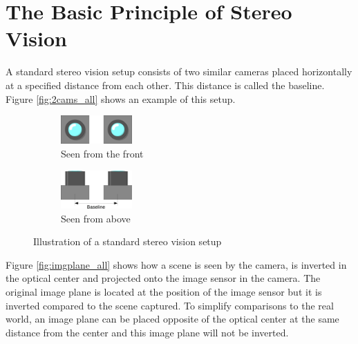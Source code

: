 \section{The Basic Principle of Stereo Vision}\label{sec:basicstereo}
A standard stereo vision setup consists of two similar cameras placed horizontally at a specified distance from each other. This distance is called the baseline. Figure \vref{fig:2cams_all} shows an example of this setup.\\
\begin{figure}[ht!]
  \centering
  \begin{subfigure}[t]{1\textwidth}
    \centering\includegraphics[width=0.3\textwidth]{figures/2cams_fro}
    \caption{Seen from the front\label{fig:2cams_fro}}
  \end{subfigure}\vspace{0.4cm}
  \begin{subfigure}[t]{1\textwidth}
    \centering\includegraphics[width=0.3\textwidth]{figures/2cams_top}
    \caption{Seen from above\label{fig:2cams_top}}
  \end{subfigure}
  \caption{Illustration of a standard stereo vision setup\label{fig:2cams_all}}
\end{figure}

Figure \vref{fig:imgplane_all} shows how a scene is seen by the camera, is inverted in the optical center and projected onto the image sensor in the camera. The original image plane is located at the position of the image sensor but it is inverted compared to the scene captured. To simplify comparisons to the real world, an image plane can be placed opposite of the optical center at the same distance from the center and this image plane will not be inverted.

